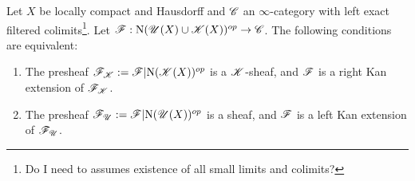 \documentclass[../../thesis.tex]{subfiles}
\begin{document}
\begin{theorem}\label{7.3.4.9}
    Let $X$ be locally compact and Hausdorff and $\mathscr{C}$ an $\infty$-category with left exact filtered colimits\footnote{Do I need to assumes existence of all small limits and colimits?}.
    Let $\mathscr{F} : \mathrm{N}(\mathscr{U}(X) \cup \mathscr{K}(X))^{op} \to \mathscr{C}$.
    The following conditions are equivalent:
    \begin{enumerate}[]
        \item The presheaf $\mathscr{F}_{\mathscr{K}}:= \mathscr{F}|\mathrm{N}(\mathscr{K}(X))^{op}$ is a $\mathscr{K}$-sheaf, and $\mathscr{F}$ is a right Kan extension of $\mathscr{F}_{\mathscr{K}}$.
        \item The presheaf $\mathscr{F}_{\mathscr{U}}:=\mathscr{F}|\mathrm{N}(\mathscr{U}(X))^{op}$ is a sheaf, and $\mathscr{F}$ is a left Kan extension of $\mathscr{F}_{\mathscr{U}}$.
    \end{enumerate}
\end{theorem}
\end{document}
